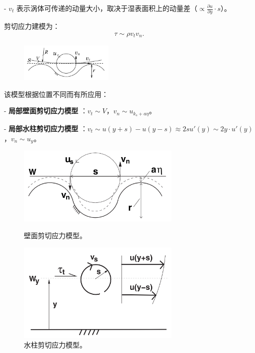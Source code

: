 \documentclass[10pt]{article}
\begin{document}
- $v_t$ 表示涡体可传递的动量大小，取决于湿表面积上的动量差（$\propto \frac{\partial u}{\partial y}\cdot s $）。

剪切应力建模为：
\begin{align*}
    \tau \sim \rho v_t v_n
.\end{align*}
\begin{figure}[ht!]
    \centering
    \includegraphics[width=0.4\textwidth]{./figures/eddies.png}
    \label{fig:-figures-eddies-png}
\end{figure}
该模型根据位置不同而有所应用：

    
- \textbf{局部壁面剪切应力模型} \cite{gioiaFriction2006}：$v_t \sim V$，$v_n\sim u_{k_s+a\eta}$。
    
- \textbf{局部水柱剪切应力模型} \cite{gioiaMVP2010}：$v_t\sim u(y+s) - u(y-s)\approx 2s u'(y) \sim 2y\cdot u'(y)$，$v_n \sim u_y$。

\begin{figure}[!htb]
    \centering
    \begin{minipage}{.5\textwidth}
        \centering
        \includegraphics[width=0.7\textwidth]{./figures/wall-shear.png}
        \caption{壁面剪切应力模型。}
        \label{fig:wall-shear}
    \end{minipage}%
    \begin{minipage}{0.5\textwidth}
        \centering
        \includegraphics[width=0.7\textwidth]{./figures/column-shear.png}
        \caption{水柱剪切应力模型。}
        \label{fig:column-shear}
    \end{minipage}
\end{figure}
\end{document}
